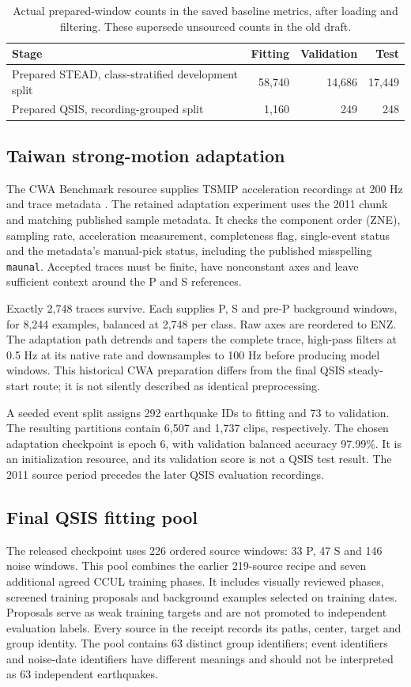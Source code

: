 \documentclass[a4paper,11pt,oneside]{article}
\newcommand{\code}[1]{\nolinkurl{#1}}
\begin{document}
\begin{table}[htbp]\centering\small
\caption{Actual prepared-window counts in the saved baseline metrics, after
loading and filtering. These supersede unsourced counts in the old draft.}
\begin{tabularx}{\linewidth}{Yrrr}
\toprule Stage & Fitting & Validation & Test \\\midrule
Prepared STEAD, class-stratified development split & 58,740 & 14,686 & 17,449 \\
Prepared QSIS, recording-grouped split & 1,160 & 249 & 248 \\\bottomrule
\end{tabularx}
\end{table}

\subsection{Taiwan strong-motion adaptation}
The CWA Benchmark resource supplies TSMIP acceleration recordings at 200 Hz
and trace metadata \cite{cwaData}. The retained adaptation experiment uses the
2011 chunk and matching published sample metadata. It checks the component
order (ZNE), sampling rate, acceleration measurement, completeness flag,
single-event status and the metadata's manual-pick status, including the
published misspelling \code{maunal}. Accepted traces must be finite, have
nonconstant axes and leave sufficient context around the P and S references.

Exactly 2,748 traces survive. Each supplies P, S and pre-P background windows,
for 8,244 examples, balanced at 2,748 per class. Raw axes are reordered to ENZ.
The adaptation path detrends and tapers the complete trace, high-pass filters
at 0.5 Hz at its native rate and downsamples to 100 Hz before producing model
windows. This historical CWA preparation differs from the final QSIS
steady-start route; it is not silently described as identical preprocessing.

A seeded event split assigns 292 earthquake IDs to fitting and 73 to
validation. The resulting partitions contain 6,507 and 1,737 clips,
respectively. The chosen adaptation checkpoint is epoch 6, with validation
balanced accuracy 97.99\%. It is an initialization resource, and its validation
score is not a QSIS test result. The 2011 source period precedes the later QSIS
evaluation recordings.

\subsection{Final QSIS fitting pool}
The released checkpoint uses 226 ordered source windows: 33 P, 47 S and 146
noise windows. This pool combines the earlier 219-source recipe and seven
additional agreed CCUL training phases. It includes visually reviewed phases,
screened training proposals and background examples selected on training
dates. Proposals serve as weak training targets and are not promoted to
independent evaluation labels. Every source in the receipt records its paths,
center, target and group identity. The pool contains 63 distinct group
identifiers; event identifiers and noise-date identifiers have different
meanings and should not be interpreted as 63 independent earthquakes.
\end{document}
